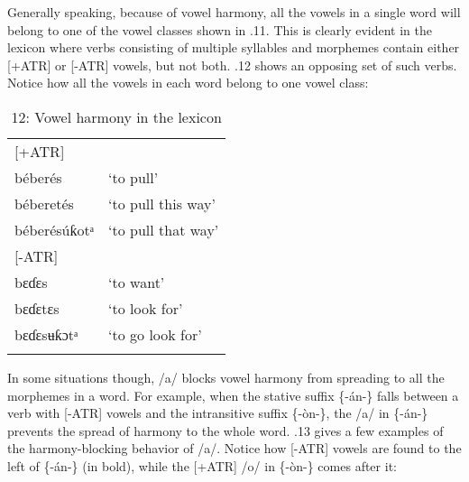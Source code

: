 Generally speaking, because of vowel harmony, all the vowels in a single word will belong to one of the vowel classes shown in .11. This is clearly evident in the lexicon where verbs consisting of multiple syllables and morphemes contain either [+ATR] or [-ATR] vowels, but not both. .12 shows an opposing set of such verbs. Notice how all the vowels in each word belong to one vowel class:


\begin{table}
\caption{12: Vowel harmony in the lexicon}
\label{tab:2}


\begin{tabularx}{\textwidth}{XX}
\lsptoprule

[+ATR] & \\
béberés & ‘to pull’\\
béberetés & ‘to pull this way’\\
béberésúƙotᵃ & ‘to pull that way’\\{}
[-ATR] & \\
bɛɗɛs & ‘to want’\\
bɛɗɛtɛs & ‘to look for’\\
bɛɗɛsʉƙɔtᵃ & ‘to go look for’\\
\lspbottomrule
\end{tabularx}
\end{table}
In some situations though, /a/ blocks vowel harmony from spreading to all the morphemes in a word. For example, when the stative suffix \{-án-\} falls between a verb with [-ATR] vowels and the intransitive suffix \{-òn-\}, the /a/ in \{-án-\} prevents the spread of harmony to the whole word. .13 gives a few examples of the harmony-blocking behavior of /a/. Notice how [-ATR] vowels are found to the left of \{-án-\} (in bold), while the [+ATR] /o/ in \{-òn-\} comes after it:



